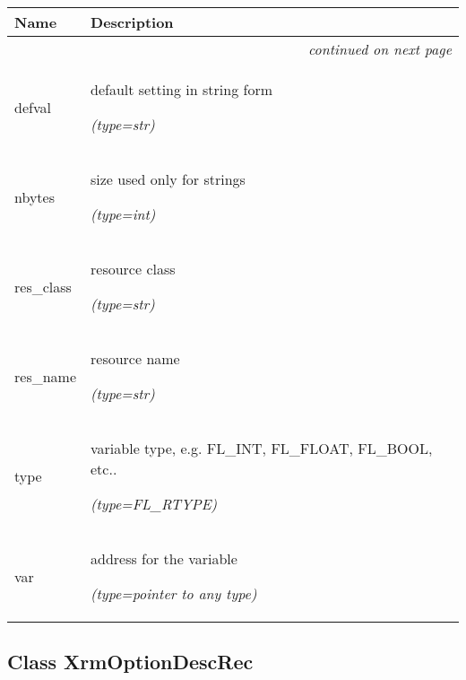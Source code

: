     \vspace{-1cm}
\hspace{\varindent}\begin{longtable}{|p{\varnamewidth}|p{\vardescrwidth}|l}
\cline{1-2}
\cline{1-2} \centering \textbf{Name} & \centering \textbf{Description}& \\
\cline{1-2}
\endhead\cline{1-2}\multicolumn{3}{r}{\small\textit{continued on next page}}\\\endfoot\cline{1-2}
\endlastfoot\raggedright d\-e\-f\-v\-a\-l\- & \raggedright default setting in string form

            {\it (type=str)}&\\
\cline{1-2}
\raggedright n\-b\-y\-t\-e\-s\- & \raggedright size used only for strings

            {\it (type=int)}&\\
\cline{1-2}
\raggedright r\-e\-s\-\_\-c\-l\-a\-s\-s\- & \raggedright resource class

            {\it (type=str)}&\\
\cline{1-2}
\raggedright r\-e\-s\-\_\-n\-a\-m\-e\- & \raggedright resource name

            {\it (type=str)}&\\
\cline{1-2}
\raggedright t\-y\-p\-e\- & \raggedright variable type, e.g. FL\_INT, FL\_FLOAT, FL\_BOOL, etc..

            {\it (type=FL\_RTYPE)}&\\
\cline{1-2}
\raggedright v\-a\-r\- & \raggedright address for the variable

            {\it (type=pointer to any type)}&\\
\cline{1-2}
\end{longtable}



\subsection{Class XrmOptionDescRec}

